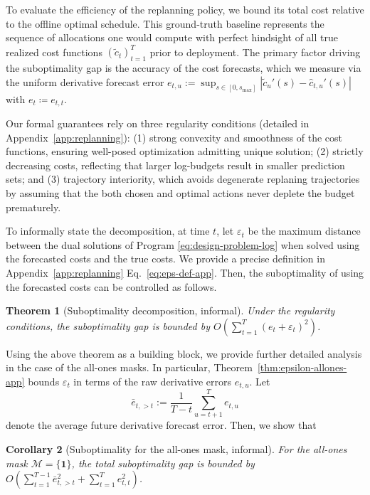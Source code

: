 \documentclass{uai2026} %
\newtheorem{theorem}{Theorem}[section]
\newtheorem{corollary}[theorem]{Corollary}
\newcommand{\1}{\mathbf{1}}
\renewcommand{\epsilon}{\varepsilon}
\newcommand{\eqdef}{\coloneqq}
\newcommand{\mcal}{\mathcal{M}}
\begin{document}
To evaluate the efficiency of the replanning policy, we bound its total cost relative to the offline optimal schedule. This ground-truth baseline represents the sequence of allocations one would compute with perfect hindsight of all true realized cost functions $(\tilde{c}_t)_{t=1}^T$ prior to deployment.
The primary factor driving the suboptimality gap is the accuracy of the cost forecasts, which we measure via the uniform derivative forecast error $e_{t,u} := \sup_{s \in [0,s_{\max}]} |\tilde{c}_u'(s) - \hat{c}_{t,u}'(s)|$ with $e_{t}\eqdef e_{t,t}$.

Our formal guarantees rely on three regularity conditions (detailed in Appendix~\ref{app:replanning}): (1) strong convexity and smoothness of the cost functions, ensuring well-posed optimization admitting unique solution; (2) strictly decreasing costs, reflecting that larger log-budgets result in smaller prediction sets; and (3) trajectory interiority, which avoids degenerate replaning trajectories by assuming that the both chosen and optimal actions never deplete the budget prematurely.

To informally state the decomposition, at time $t$, let $\epsilon_t$ be the maximum distance between the dual solutions of Program \ref{eq:design-problem-log} when solved using the forecasted costs and the true costs. We provide a precise definition in Appendix~\ref{app:replanning} Eq.~\ref{eq:eps-def-app}. Then, the suboptimality of using the forecasted costs can be controlled as follows.

\begin{theorem}[Suboptimality decomposition, informal]
  \label{thm:regret-decomp-informal}
  Under the regularity conditions, the suboptimality gap is bounded by $O\!\left( \sum_{t=1}^T (e_t + \epsilon_t)^2 \right)$.
\end{theorem}

Using the above theorem as a building block, we provide further detailed analysis in the case of the all-ones masks. In particular, Theorem~\ref{thm:epsilon-allones-app} bounds $\epsilon_t$ in terms of the raw derivative errors $e_{t,u}$. Let $$\bar{e}_{t,>t} := \frac{1}{T-t} \sum_{u=t+1}^{T} e_{t,u}$$ denote the average future derivative forecast error. Then, we show that
\begin{corollary}[Suboptimality for the all-ones mask, informal]
  \label{cor:regret-allones-informal}
  For the all-ones mask $\mcal = \{\1\}$, the total suboptimality gap is bounded by
  $O\!\left( \sum_{t=1}^{T-1} \bar{e}_{t,>t}^2 + \sum_{t=1}^{T} e_{t,t}^2 \right)$.
\end{corollary}
\end{document}
